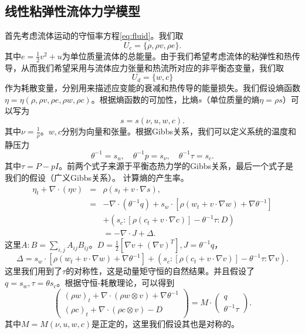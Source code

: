 	\subsection{线性粘弹性流体力学模型}
	首先考虑流体运动的守恒率方程\eqref{eq:fluid}。我们取
	\begin{equation*}
		U_c = \{\rho, \rho v, \rho e\}.
	\end{equation*}
	其中$e = \frac{1}{2} v^2 + u$为单位质量流体的总能量。由于我们希望考虑流体的粘弹性和热传导，从而我们希望采用与流体应力张量和热流所对应的非平衡态变量，我们取
	\begin{equation*}
		U_d = \{ w, c\}
	\end{equation*}
	作为耗散变量，分别用来描述应变能的衰减和热传导的能量损失。我们假设熵函数$\eta = \eta (\rho,\rho v ,\rho e, \rho w, \rho c)$。根据熵函数的可加性，比熵$s$（单位质量的熵$\eta = \rho s$）可以写为
	\begin{equation*}
		s = s(\nu, u, w, c).
	\end{equation*}
	其中$\nu = \frac{1}{\rho}$。$w,c$分别为向量和张量。根据Gibbs关系，我们可以定义系统的温度和静压力
	\begin{equation*}
		\theta^{-1} = s_u, \quad \theta^{-1} p = s_{\nu}, \quad \theta^{-1} \tau = s_c.
	\end{equation*}
	其中$\tau = P - pI$。前两个式子来源于平衡态热力学的Gibbs关系，最后一个式子是我们的假设（广义Gibbs关系）。
    计算熵的产生率。
	\begin{eqnarray*}
		\eta_t + \nabla \cdot (\eta v) &=& \rho (s_t + v \cdot \nabla s), \\
		&=& -\nabla \cdot (\theta^{-1} q) + s_w \cdot [\rho (w_t + v \cdot \nabla w) + \nabla \theta^{-1}] \\
		&&+ (s_c:[\rho (c_t + v \cdot \nabla c)] - \theta^{-1} \tau : D) \\
		&& = -\nabla \cdot J + \Delta.
	\end{eqnarray*}
	这里$A:B = \sum_{i,j}A_{ij}B_{ij}$。$D = \frac{1}{2} [\nabla v + (\nabla v)^T], J =\theta^{-1} q $，
	\begin{equation*}
		\Delta = s_w \cdot [\rho (w_t + v \cdot \nabla w) + \nabla \theta^{-1}] + (s_c:[\rho (c_t + v \cdot \nabla v)] - \theta^{-1} \tau : \nabla v) .
	\end{equation*}
	这里我们用到了$\tau$的对称性，这是动量矩守恒的自然结果\cite{dimitrienko2010nonlinear}。并且假设了$q =s_w,\tau = \theta s_c$。根据守恒-耗散理论，可以得到
	\begin{equation} \label{eq:CDFgeneral  }
		\left( \begin{array}{c} 
			(\rho w)_t +  \nabla \cdot (\rho w \otimes v)  + \nabla \theta^{-1} \\
			(\rho c)_t +  \nabla \cdot (\rho c \otimes v)  - D
		\end{array} \right) = M \cdot
		\left( \begin{array}{c} 
			q \\ \theta^{-1} \tau
		\end{array}\right).
	\end{equation}
	其中$M=M(\nu,u,w,c)$是正定的，这里我们假设其也是对称的。

